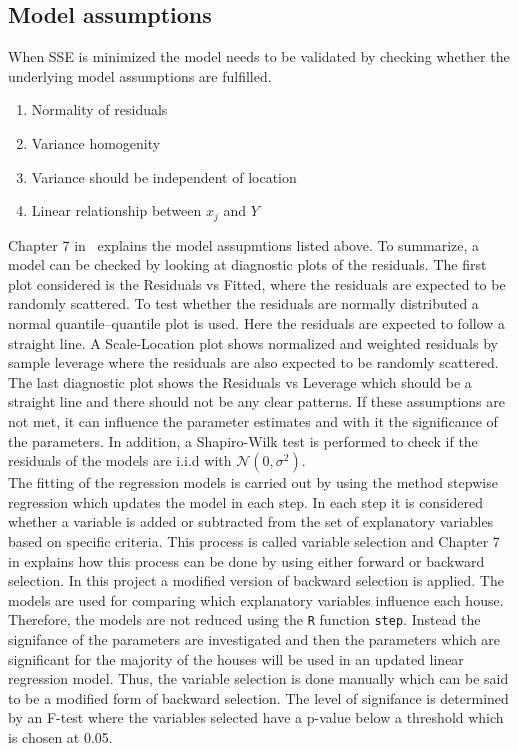 \subsection{Model assumptions}
\noindent When SSE is minimized the model needs to be validated by checking whether the underlying model assumptions are fulfilled.
\begin{enumerate} [label=\textbf{\arabic*}]
    \item Normality of residuals
    \item Variance homogenity
    \item Variance should be independent of location
    \item Linear relationship between $x_j$ and $Y$
\end{enumerate}
Chapter 7 in \cite{Stat_bog} explains the model assupmtions listed above. To summarize, a model can be checked by looking at diagnostic plots of the residuals. The first plot considered is the Residuals vs Fitted, where the residuals are expected to be randomly scattered. To test whether the residuals are normally distributed a normal quantile–quantile plot is used. Here the residuals are expected to follow a straight line. A Scale-Location plot shows normalized and weighted residuals by sample leverage where the residuals are also expected to be randomly scattered. The last diagnostic plot shows the Residuals vs Leverage which should be a straight line and there should not be any clear patterns. If these assumptions are not met, it can influence the parameter estimates and with it the significance of the parameters. In addition, a Shapiro-Wilk test is performed to check if the residuals of the models are i.i.d with $\mathcal{N}(0,\sigma^2)$. \\

\noindent The fitting of the regression models is carried out by using the method stepwise regression which updates the model in each step. In each step it is considered whether a variable is added or subtracted from the set of explanatory variables based on specific criteria. This process is called variable selection and Chapter 7 in \cite{Stat_bog2} explains how this process can be done by using either forward or backward selection. In this project a modified version of backward selection is applied. The models are used for comparing which explanatory variables influence each house. Therefore, the models are not reduced using the \texttt{R} function \texttt{step}. Instead the signifance of the parameters are investigated and then the parameters which are significant for the majority of the houses will be used in an updated linear regression model. Thus, the variable selection is done manually which can be said to be a modified form of backward selection. The level of signifance is determined by an F-test where the variables selected have a p-value below a threshold which is chosen at 0.05.\\

